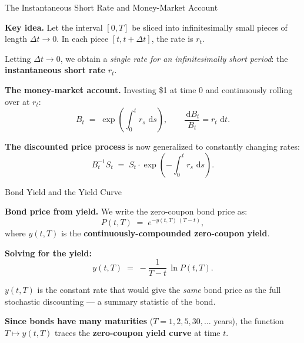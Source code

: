 \documentclass[compress]{beamer}
\newcommand{\dd}{\,\mathrm{d}}
\begin{document}
\begin{frame}{The Instantaneous Short Rate and Money-Market Account}

\textbf{Key idea.}  Let the interval $[0,T]$ be sliced into infinitesimally small pieces of length $\Delta t \to 0$. In each piece $[t, t+\Delta t]$, the rate is $r_t$.

\medskip
Letting $\Delta t \to 0$, we obtain a \textit{single rate for an infinitesimally short period}: the \textbf{instantaneous short rate} $r_t$.

\medskip
\textbf{The money-market account.}  Investing \$1 at time 0 and continuously rolling over at $r_t$:
\[
	B_t \;=\; \exp\!\left(\int_0^t r_s\,\dd s\right), \qquad \frac{\dd B_t}{B_t} = r_t\,\dd t.
\]

\medskip
\textbf{The discounted price process} is now generalized to constantly changing rates:
\[
	B_t^{-1} S_t \;=\; S_t \cdot \exp\!\left(-\int_0^t r_s\,\dd s\right).
\]

\end{frame}

\begin{frame}{Bond Yield and the Yield Curve}

\textbf{Bond price from yield.}  We write the zero-coupon bond price as:
\[
	P(t,T) \;=\; e^{-y(t,T)\,(T-t)},
\]
where $y(t,T)$ is the \textbf{continuously-compounded zero-coupon yield}.

\medskip
\textbf{Solving for the yield:}
\[
	y(t,T) \;=\; -\frac{1}{T-t}\,\ln P(t,T).
\]

\medskip
$y(t,T)$ is the constant rate that would give the \textit{same} bond price as the full stochastic discounting — a summary statistic of the bond.

\medskip
\textbf{Since bonds have many maturities} ($T = 1, 2, 5, 30, \ldots$ years), the function $T \mapsto y(t,T)$ traces the \textbf{zero-coupon yield curve} at time $t$.

\medskip
\begin{center}
\small
{}
\end{center}

\end{frame}
\end{document}
